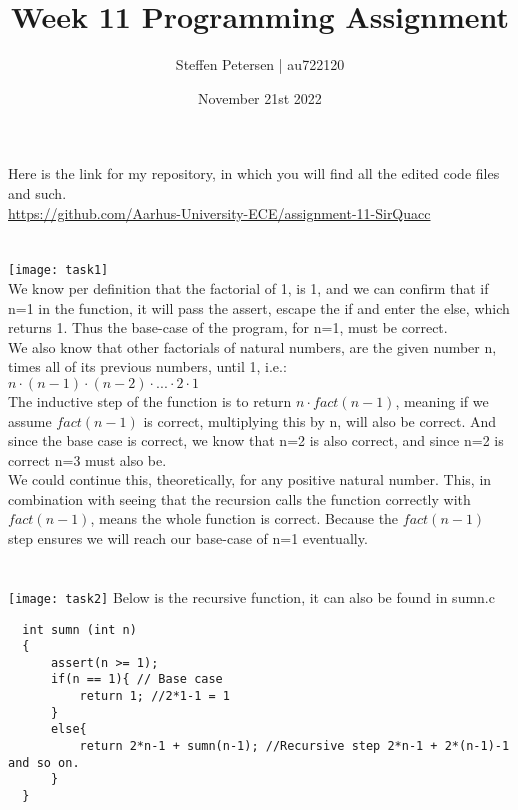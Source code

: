 \documentclass{article}
\title{Week 11 Programming Assignment}
\author{Steffen Petersen | au722120}
\date{November 21st 2022}
\begin{document}

\maketitle
\vspace{5pt}
\noindent Here is the link for my repository, in which you will find all the edited code files and such.\\
\url{https://github.com/Aarhus-University-ECE/assignment-11-SirQuacc}
\section{}
\texttt{[image: task1]}
\vspace{2pt}\\
We know per definition that the factorial of 1, is 1, and we can confirm that if n=1 in the function, it will pass the assert,
escape the if and enter the else, which returns 1. Thus the base-case of the program, for n=1, must be correct.\\
We also know that other factorials of natural numbers, are the given number n, times all of its previous numbers, until 1, i.e.:\\
$n \cdot (n-1) \cdot (n-2) \cdot ... \cdot 2 \cdot 1$\\
The inductive step of the function is to return $n \cdot fact(n-1)$, meaning if we assume $fact(n-1)$ is correct, multiplying this
by n, will also be correct. And since the base case is correct, we know that n=2 is also correct, and since n=2 is correct n=3 must also be.\\
We could continue this, theoretically, for any positive natural number. This, in combination with seeing that the recursion calls 
the function correctly with $fact(n-1)$, means the whole function is correct. Because the $fact(n-1)$ step ensures we will reach our
base-case of n=1 eventually.


\section{}
\texttt{[image: task2]}
\vspace{2pt}
Below is the recursive function, it can also be found in sumn.c
\begin{lstlisting}
  int sumn (int n)
  {
      assert(n >= 1);
      if(n == 1){ // Base case
          return 1; //2*1-1 = 1
      }
      else{
          return 2*n-1 + sumn(n-1); //Recursive step 2*n-1 + 2*(n-1)-1 and so on.
      }
  }
\end{lstlisting}
\end{document}
